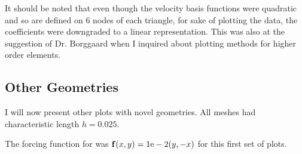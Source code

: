 \documentclass[12pt]{article}
\begin{document}
            It should be noted that even though the velocity basis functions were quadratic and so are defined on 6 nodes of each triangle, for sake
            of plotting the data, the coefficients were downgraded to a linear representation. This was also at the suggestion of Dr. Borggaard when I inquired
            about plotting methods for higher order elements.

            \clearpage
            \subsection{Other Geometries}

            I will now present other plots with novel geometries. All meshes had characteristic length $h = 0.025$.

            The forcing function for was $\mathbf{f}(x,y) = 1\text{e}-2 (y, -x)$ for this first set of plots.
\end{document}
